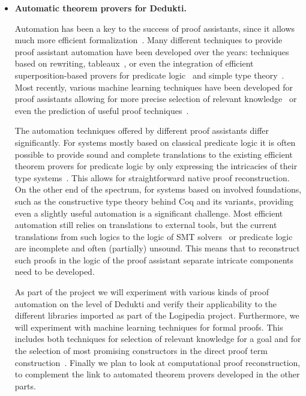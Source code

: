 \begin{itemize}
\item{\bf Automatic theorem provers for Dedukti.}

  Automation has been a key to the success of proof assistants, since it
allows much more efficient formalization~\cite{Hales-Developments}.
Many different techniques to provide proof assistant automation have
been developed over the years: techniques based on rewriting,
tableaux~\cite{Paulson-blast}, or even the integration of efficient
superposition-based provers for predicate logic~\cite{hurd-metis} and
simple type theory~\cite{asperti-matita-paramodulation}. Most
recently, various machine learning techniques have been developed for
proof assistants allowing for more precise selection of relevant
knowledge~\cite{blanchette-h4qed-jfr} or even the prediction of useful
proof techniques~\cite{gauthier-tactictoe}.

The automation techniques offered by different proof assistants differ
significantly. For systems mostly based on classical predicate logic
it is often possible to provide sound and complete translations to the
existing efficient theorem provers for predicate logic by only
expressing the intricacies of their type
systems~\cite{kaliszyk-miz40}. This allows for straightforward native
proof reconstruction. On the other end of the spectrum, for
systems based on involved foundations, such
as the constructive type theory behind Coq and its variants,
providing even a slightly useful automation is a significant
challenge. Most efficient automation still relies on translations to
external tools, but the current translations from such logics to
the logic of SMT solvers~\cite{DBLP:conf/cpp/ArmandFGKTW11} or
predicate logic~\cite{DBLP:journals/jar/CzajkaK18} are incomplete
and often (partially) unsound. This means that to reconstruct such
proofs in the logic of the proof assistant separate intricate
components need to be developed.

As part of the project we will experiment with various kinds of proof
automation on the level of Dedukti and verify their applicability to
the different libraries imported as part of the Logipedia project.
Furthermore, we will experiment with machine learning techniques for
formal proofs. This includes both techniques for selection of relevant
knowledge for a goal and for the selection of most promising
constructors in the direct proof term
construction~\cite{ZielenkiewiczSchubert2016}. Finally we plan to look
at computational proof reconstruction, to complement the link to
automated theorem provers developed in the other parts.


\end{itemize}
